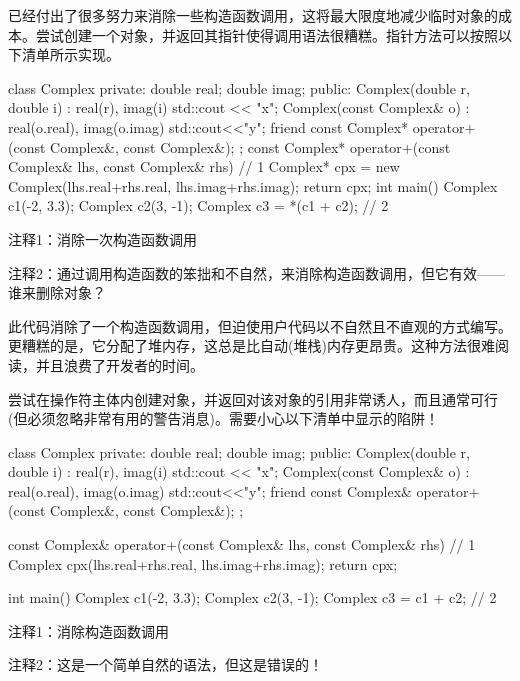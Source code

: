 
已经付出了很多努力来消除一些构造函数调用，这将最大限度地减少临时对象的成本。尝试创建一个对象，并返回其指针使得调用语法很糟糕。指针方法可以按照以下清单所示实现。


\begin{cpp}
class Complex {
private:
  double real;
  double imag;
public:
  Complex(double r, double i) : real(r), imag(i) { std::cout << "x\n"; }
  Complex(const Complex& o) : real(o.real), imag(o.imag) {
    std::cout<<"y\n"; }
  friend const Complex* operator+(const Complex&, const Complex&);
};
const Complex* operator+(const Complex& lhs, const Complex& rhs) { // 1
  Complex* cpx = new Complex(lhs.real+rhs.real, lhs.imag+rhs.imag);
  return cpx;
}
int main() {
  Complex c1(-2, 3.3);
  Complex c2(3, -1);
  Complex c3 = *(c1 + c2); // 2
}
\end{cpp}

{\footnotesize
注释1：消除一次构造函数调用

注释2：通过调用构造函数的笨拙和不自然，来消除构造函数调用，但它有效——谁来删除对象？
}

此代码消除了一个构造函数调用，但迫使用户代码以不自然且不直观的方式编写。更糟糕的是，它分配了堆内存，这总是比自动(堆栈)内存更昂贵。这种方法很难阅读，并且浪费了开发者的时间。

尝试在操作符主体内创建对象，并返回对该对象的引用非常诱人，而且通常可行(但必须忽略非常有用的警告消息)。需要小心以下清单中显示的陷阱！


\begin{cpp}
class Complex {
private:
  double real;
  double imag;
public:
  Complex(double r, double i) : real(r), imag(i) { std::cout << "x\n"; }
  Complex(const Complex& o) : real(o.real), imag(o.imag) {
    std::cout<<"y\n"; }
  friend const Complex& operator+(const Complex&, const Complex&);
};

const Complex& operator+(const Complex& lhs, const Complex& rhs) { // 1
  Complex cpx(lhs.real+rhs.real, lhs.imag+rhs.imag);
  return cpx;
}

int main() {
  Complex c1(-2, 3.3);
  Complex c2(3, -1);
  Complex c3 = c1 + c2; // 2
}
\end{cpp}

{\footnotesize
注释1：消除构造函数调用

注释2：这是一个简单自然的语法，但这是错误的！
}

